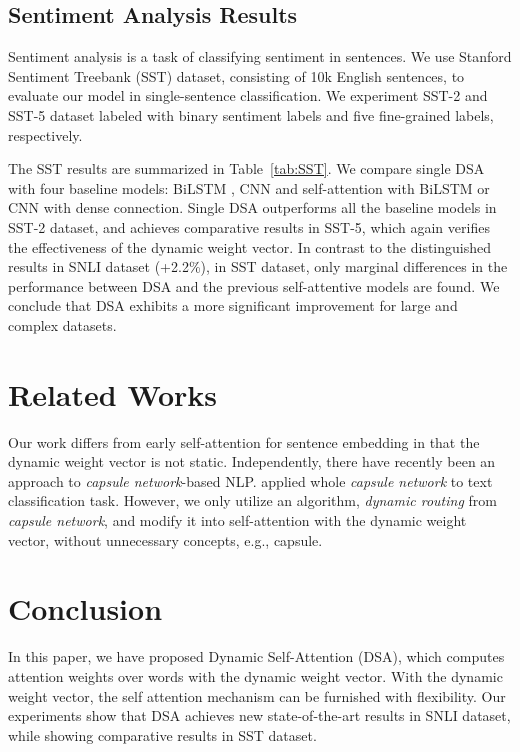 \documentclass[11pt,a4paper]{article}
\begin{document}
\subsection {Sentiment Analysis Results}
Sentiment analysis is a task of classifying sentiment in sentences. We use Stanford Sentiment Treebank (SST) dataset, consisting of 10k English sentences, to evaluate our model in single-sentence classification. We experiment SST-2 and SST-5 dataset labeled with binary sentiment labels and five fine-grained labels, respectively. 

The SST results are summarized in Table~\ref{tab:SST}. We compare single DSA with four baseline models: BiLSTM \cite{baseline_lstm_bilstm}, CNN \cite{yoonkim} and self-attention with BiLSTM or CNN with dense connection. Single DSA outperforms all the baseline models in SST-2 dataset, and achieves comparative results in SST-5, which again verifies the effectiveness of the dynamic weight vector. In contrast to the distinguished results in SNLI dataset (+2.2\%), in SST dataset, only marginal differences in the performance between DSA and the previous self-attentive models are found. We conclude that DSA exhibits a more significant improvement for large and complex datasets.





\section{Related Works}\label{relatedworks}




Our work differs from early self-attention for sentence embedding \cite{Yang,hierarchical,self-attentive,disan} in that the dynamic weight vector is not static. Independently, there have recently been an approach to \textit{capsule network}-based NLP. \citet{capsuletext2} applied whole \textit{capsule network} to text classification task. However, we only utilize an algorithm, \textit{dynamic routing} from \textit{capsule network}, and modify it into self-attention with the dynamic weight vector, without unnecessary concepts, e.g., capsule.

\section{Conclusion}\label{conclusion}

In this paper, we have proposed Dynamic Self-Attention (DSA), which computes attention weights over words with the dynamic weight vector. With the dynamic weight vector, the self attention mechanism can be furnished with flexibility. Our experiments show that DSA achieves new state-of-the-art results in SNLI dataset, while showing comparative results in SST dataset.
\end{document}
